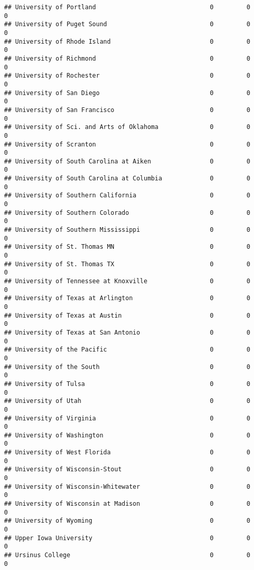 \documentclass[
]{article}
\begin{document}
\begin{verbatim}
## University of Portland                               0         0           0
## University of Puget Sound                            0         0           0
## University of Rhode Island                           0         0           0
## University of Richmond                               0         0           0
## University of Rochester                              0         0           0
## University of San Diego                              0         0           0
## University of San Francisco                          0         0           0
## University of Sci. and Arts of Oklahoma              0         0           0
## University of Scranton                               0         0           0
## University of South Carolina at Aiken                0         0           0
## University of South Carolina at Columbia             0         0           0
## University of Southern California                    0         0           0
## University of Southern Colorado                      0         0           0
## University of Southern Mississippi                   0         0           0
## University of St. Thomas MN                          0         0           0
## University of St. Thomas TX                          0         0           0
## University of Tennessee at Knoxville                 0         0           0
## University of Texas at Arlington                     0         0           0
## University of Texas at Austin                        0         0           0
## University of Texas at San Antonio                   0         0           0
## University of the Pacific                            0         0           0
## University of the South                              0         0           0
## University of Tulsa                                  0         0           0
## University of Utah                                   0         0           0
## University of Virginia                               0         0           0
## University of Washington                             0         0           0
## University of West Florida                           0         0           0
## University of Wisconsin-Stout                        0         0           0
## University of Wisconsin-Whitewater                   0         0           0
## University of Wisconsin at Madison                   0         0           0
## University of Wyoming                                0         0           0
## Upper Iowa University                                0         0           0
## Ursinus College                                      0         0           0

\end{verbatim}
\end{document}

